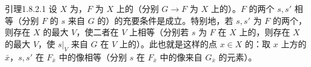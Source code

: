 \begin{SGAresult}{引理}{1.8.2.1}
设 $X$ 为，$F$ 为 $X$ 上的（分别 $G\to F$ 为 $X$ 上的）。$F$ 的两个 $s,s'$ 相等（分别 $F$ 的 $s$ 来自 $G$ 的）的充要条件是成立。特别地，若 $s,s'$ 为 $F$ 的两个，则存在 $X$ 的最大 $V$，使二者在 $V$ 上相等（分别若 $s$ 为 $F$ 在 $X$ 上的，则存在 $X$ 的最大 $V$，使 $s|_V$ 来自 $G$ 在 $V$ 上的）。此也就是这样的点 $x\in X$ 的：取 $x$ 上方的 $\bar x$，$s,s'$ 在 $F_{\bar x}$ 中的像相等（分别 $s$ 在 $F_{\bar x}$ 中的像来自 $G_{\bar x}$ 的元素）。
\end{SGAresult}
